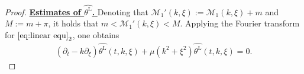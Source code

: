 \documentclass[10pt,a4paper]{amsart}
\newcommand{\pt}{\partial_t}
\newcommand{\pxi}{\partial_\xi}
\begin{document}
	\begin{proof}
		\underline{\bf Estimates of $\widehat{\theta^{\mathrm{L}}}$. }
		Denoting that $ \mathcal{M}_1' (k, \xi):= {\mathcal{M}_1} (k, \xi) + m$ and $M:= m+\pi$, it holds that $m<\mathcal{M}_1' (k, \xi)<M$. Applying the Fourier transform for $\eqref{eq:linear equ}_2$, one obtains 
		\begin{align} \label{eq:linear Fourier}
			(\pt- k\pxi) \widehat{\theta^{\mathrm{L}} }(t, k, \xi)  + \mu(k^2 + \xi^2) \widehat{\theta^{\mathrm{L}} }(t, k, \xi)   = 0.
		\end{align}

\end{proof}
\end{document}
